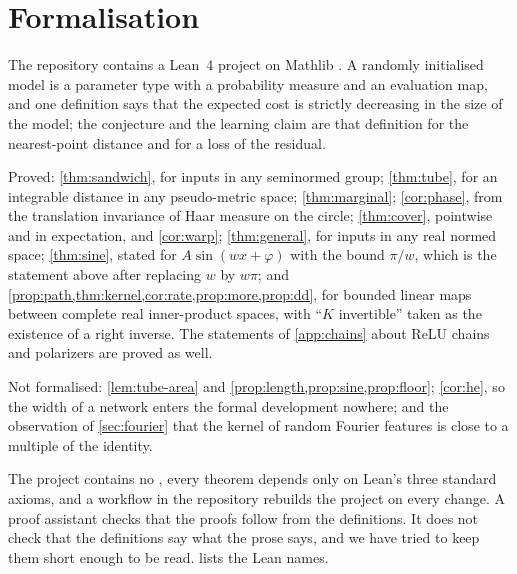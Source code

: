 \section{Formalisation}
\label{sec:lean}

The repository contains a Lean~4 project \citep{demoura2021lean4} on Mathlib
\citep{mathlib2020}. A randomly initialised model is a parameter type with a
probability measure and an evaluation map, and one definition says that the
expected cost is strictly decreasing in the size of the model; the conjecture
and the learning claim are that definition for the nearest-point distance and
for a loss of the residual.

Proved: \cref{thm:sandwich}, for inputs in any seminormed group; \cref{thm:tube},
for an integrable distance in any pseudo-metric space; \cref{thm:marginal};
\cref{cor:phase}, from the translation invariance of Haar measure on the
circle; \cref{thm:cover}, pointwise and in expectation, and \cref{cor:warp}; \cref{thm:general}, for inputs in any real normed space; \cref{thm:sine}, stated
for $A\sin(wx+\varphi)$ with the bound $\pi/w$, which is the statement above
after replacing $w$ by $w\pi$; and \cref{prop:path,thm:kernel,cor:rate,prop:more,prop:dd},
for bounded linear maps between complete real inner-product spaces, with
``$K$ invertible'' taken as the existence of a right inverse. The statements of
\cref{app:chains} about ReLU chains and polarizers are proved as well.

Not formalised: \cref{lem:tube-area} and \cref{prop:length,prop:sine,prop:floor};
\cref{cor:he}, so the width of a network enters the formal development nowhere;
and the observation of \cref{sec:fourier} that the kernel of random Fourier
features is close to a multiple of the identity.

The project contains no , every theorem depends only on Lean's three
standard axioms, and a workflow in the repository rebuilds the project on every
change. A proof assistant checks that the proofs follow from the definitions.
It does not check that the definitions say what the prose says, and we have
tried to keep them short enough to be read.  lists the Lean
names.
